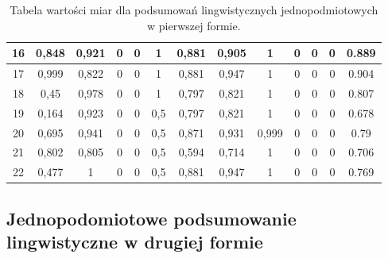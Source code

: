 \documentclass{classrep}
\begin{document}
\begin{center}
\begin{table}[H]
\begin{adjustbox}{center=11cm}
\begin{tabularx}{\textwidth}{ccccccccccccc}
    16 &0,848 & 0,921 & 0 & 0 & 1 & 0,881 & 0,905 & 1 & 0 & 0 & 0 & 0.889 \\ \hline
    17 &0,999 & 0,822 & 0 & 0 & 1 & 0,881 & 0,947 & 1 & 0 & 0 & 0 & 0.904 \\ \hline
    18 & 0,45 & 0,978 & 0 & 0 & 1 & 0,797 & 0,821 & 1 & 0 & 0 & 0 & 0.807 \\ \hline
    19 & 0,164 & 0,923 & 0 & 0 & 0,5 & 0,797 & 0,821 & 1 & 0 & 0 & 0 & 0.678 \\ \hline
    20 & 0,695 & 0,941 & 0 & 0 & 0,5 & 0,871 & 0,931 & 0,999 & 0 & 0 & 0 & 0.79\\ \hline
    21 & 0,802 & 0,805 & 0 & 0 & 0,5 & 0,594 & 0,714 & 1 & 0 & 0 & 0 & 0.706\\ \hline
    22 & 0,477 & 1 & 0 & 0 & 0,5 & 0,881 & 0,947 & 1 & 0 & 0 & 0 & 0.769\\ \hline

  \end{tabularx}
\end{adjustbox}
  \caption{Tabela wartości miar dla podsumowań lingwistycznych jednopodmiotowych w pierwszej formie.}
\end{table}
\end{center}


\subsection{Jednopodomiotowe podsumowanie lingwistyczne w drugiej formie}
\end{document}
